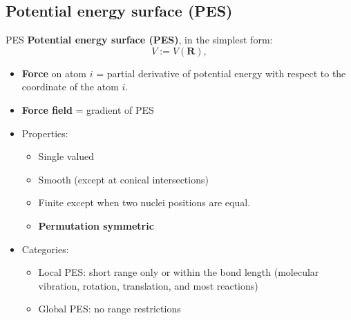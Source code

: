 \documentclass{beamer}
\newcommand\Fontvi{\fontsize{8}{7.2}\selectfont} %
\begin{document}
\subsection{Potential energy surface (PES)}
\begin{frame}{PES}
    \textbf{Potential energy surface (PES)}, in the simplest form:
    \begin{equation}
        V := V(\mathbf{R}),
    \end{equation}
    \begin{itemize}
        \Fontvi
        \item \textbf{Force} on atom $i$ = partial derivative of potential energy with respect to the coordinate of the atom $i$.
        \item \textbf{Force field} = gradient of PES
        \item Properties:
        \begin{itemize}
            \Fontvi
            \item Single valued
            \item Smooth (except at conical intersections)
            \item Finite except when two nuclei positions are equal.
            \item \textbf{Permutation symmetric}
        \end{itemize}
        \item Categories:
        \begin{itemize}
            \Fontvi
            \item Local PES: short range only or within the bond length (molecular vibration, rotation, translation, and most reactions)
            \item Global PES: no range restrictions
        \end{itemize}
        
    \end{itemize}
\end{frame}
\end{document}
